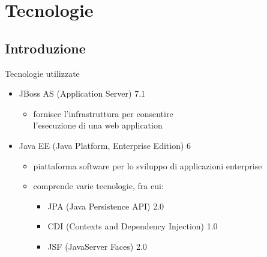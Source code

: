 \section{Tecnologie}

\subsection{Introduzione}

\begin{frame}{Tecnologie utilizzate}

\begin{itemize}
\item JBoss AS (Application Server) 7.1
	\begin{itemize}
	
	\vspace{0.5em}
	
	\item fornisce l'infrastruttura per consentire \\
			l'esecuzione di una web application
	\end{itemize}

\vspace{1em}

\item Java EE (Java Platform, Enterprise Edition) 6
	\begin{itemize}
	
	\vspace{0.5em}
	
	\item piattaforma software per lo sviluppo di applicazioni enterprise
	
	\vspace{0.7em}
	
	\item comprende varie tecnologie, fra cui:
		\begin{itemize}
		
		\vspace{0.4em}
		
		\item JPA (Java Persistence API) 2.0
		
		\vspace{0.6em}
		
		\item CDI (Contexts and Dependency Injection) 1.0
		
		\vspace{0.6em}
		
		\item JSF (JavaServer Faces) 2.0
		\end{itemize}
		
	\end{itemize}

\end{itemize}


\end{frame}

